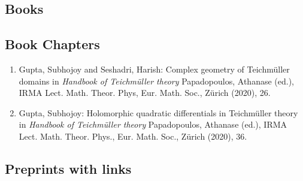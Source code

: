 \subsection{Books}



\subsection{Book Chapters}

\begin{enumerate}
\item Gupta, Subhojoy and Seshadri, Harish: Complex geometry of Teichmüller domains in {\em Handbook of Teichmüller theory} Papadopoulos, Athanase (ed.), IRMA Lect. Math. Theor. Phys, Eur. Math. Soc., Zürich (2020), 26.
\item Gupta, Subhojoy: Holomorphic quadratic differentials in Teichmüller theory in {\em Handbook of Teichmüller theory} Papadopoulos, Athanase (ed.), IRMA Lect. Math. Theor. Phys., Eur. Math. Soc., Zürich (2020), 36.
\end{enumerate}


\subsection{Preprints with links}

